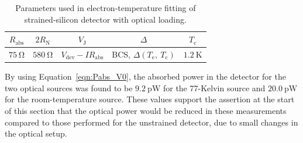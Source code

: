 \begin{table}[htb]
\caption[Parameters used in electron-temperature fitting of strained-silicon detector with optical loading]{Parameters used in electron-temperature fitting of strained-silicon detector with optical loading.} 
\label{tab:strainedTeParams_optical}
\centering
\begin{tabular}{ccccc}
\toprule\toprule
$R_{\mathrm{abs}}$ & $2R_{\mathrm{N}}$ & $V_{\mathrm{J}}$ & $\varDelta$ & $T_{\mathrm{c}}$ \\ \midrule
$75~\mathrm{\Omega}$ & $580~\mathrm{\Omega}$ & $V_{\mathrm{dev}} - IR_{\mathrm{abs}}$ 
& BCS, $\varDelta\left(T_{\mathrm{e}},~T_{\mathrm{c}}\right)$ & $1.2~\mathrm{K}$ \\
\bottomrule
\end{tabular}
\end{table}
\par 
By using Equation~\ref{eqn:Pabs_V0}, the absorbed power in the detector for the two optical sources was found to be $9.2~\mathrm{pW}$ for the 77-Kelvin source and $20.0~\mathrm{pW}$ for the room-temperature source. These values support the assertion at the start of this section that the optical power would be reduced in these measurements compared to those performed for the unstrained detector, due to small changes in the optical setup.
%
